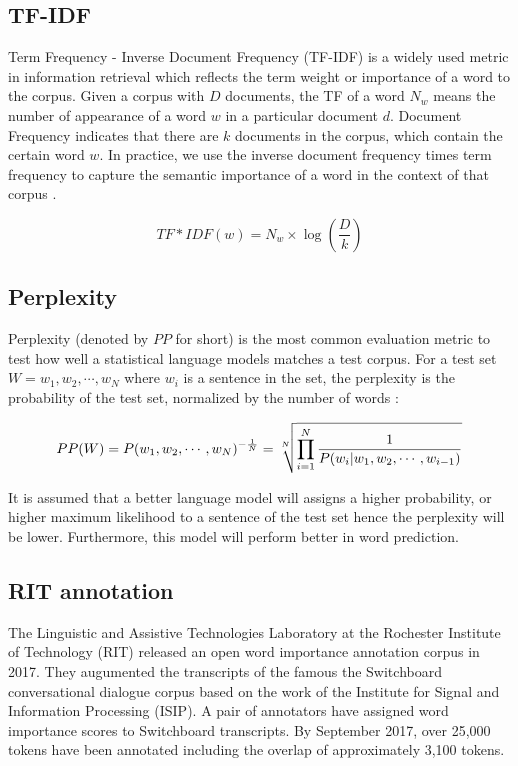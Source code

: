 \subsection{TF-IDF}
Term Frequency - Inverse Document Frequency (TF-IDF) is a widely used metric in information retrieval which reflects the term weight or importance of a word to the corpus. Given a corpus with $D$ documents, the TF of a word $N_w$ means the number of appearance of a word $w$ in a particular document $d$. Document Frequency indicates that there are $k$ documents in the corpus, which contain the certain word $w$. In practice, we use the inverse document frequency times term frequency to capture the semantic importance of a word in the context of that corpus \citep{Jurafsky2008}.

\begin{equation}
TF*IDF(w) = N_w \times \log(\frac{D}{k})
\label{eq:tf-idf}
\end{equation}

\subsection{Perplexity}
Perplexity (denoted by $PP$ for short) is the most common evaluation metric to test how well a statistical language models matches a test corpus.  For a test set $W = {w_1, w_2, \cdots, w_N}$ where $w_i$ is a sentence in the set, the perplexity is the probability of the test set, normalized by the number of words \citep{Jurafsky2008}:

\begin{equation}
PP(W) = P(w_1, w_2, \cdots, w_N)^{-\frac{1}{N}}\\
= \sqrt[N]{\prod_{i=1}^{N} \frac{1}{P(w_i|w_1, w_2,\cdots, w_{i-1})}}
\label{eq:perplexity}
\end{equation}

It is assumed that a better language model will assigns a higher probability, or higher maximum likelihood to a sentence of the test set hence the perplexity will be lower. Furthermore, this model will perform better in word prediction.

\subsection{RIT annotation}
The Linguistic and Assistive Technologies Laboratory at the Rochester Institute of Technology (RIT) released an open word importance annotation corpus in 2017. They augumented the transcripts of the famous the Switchboard conversational dialogue corpus \citep{Godfrey1992} based on the work of the Institute for Signal and Information Processing (ISIP). A pair of annotators have assigned word importance scores to Switchboard transcripts. By September 2017, over 25,000 tokens have been annotated including the overlap of approximately 3,100 tokens. 

